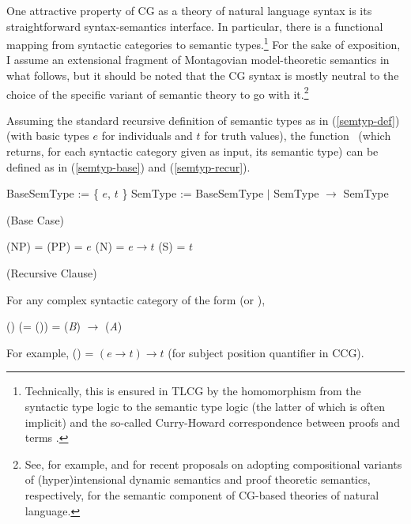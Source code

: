 \documentclass[output=paper
                ,modfonts
                ,nonflat
	        ,collection
	        ,collectionchapter
	        ,collectiontoclongg
 	        ,biblatex
                ,babelshorthands
                ,newtxmath
                ,draftmode
                ,colorlinks, citecolor=brown
]{./langsci/langscibook}
\begin{document}
One attractive property of CG as a theory of natural language syntax
is its straightforward syntax-semantics
interface. In particular, there is a 
functional mapping from syntactic categories to semantic
types.\footnote{Technically, this is ensured in TLCG by the 
homomorphism from the syntactic type logic to the semantic type logic
(the latter of which is often implicit) and the so-called Curry-Howard
correspondence between proofs and terms \citep{vanBenthem88}.}
For the sake of exposition, I assume an extensional fragment of
Montagovian model-theoretic semantics in what follows, but it should be noted that the
CG syntax is mostly neutral to the choice of the specific variant of
semantic theory to go with it.\footnote{See,  for example,  \citet{martin2013} and
\citet{bekkimineshima17} for recent proposals on adopting compositional variants
of (hyper)intensional dynamic semantics and proof theoretic semantics,
respectively, for the semantic component of CG-based theories of
natural language.}

Assuming the standard recursive definition of semantic types
as in (\ref{semtyp-def}) (with basic types $e$ for
individuals and $t$ for truth values), the function \SemTyp\ (which returns, for each
syntactic category given as input, its semantic type) can be defined as in
(\ref{semtyp-base}) and (\ref{semtyp-recur}).

\begin{exe}
 \ex\label{semtyp-def}
  \begin{xlist}
 \ex
    BaseSemType := \{ $e$, $t$ \}
 \ex
    SemType := BaseSemType $|$ SemType \ensuremath{ \rightarrow } SemType
  \end{xlist}
 \ex\label{semtyp-base}
  (Base Case)
  \begin{xlist}
 \ex\label{semtyp-np}
    \SemTyp(NP) = \SemTyp(PP) = $e$
 \ex\label{semtyp-n}
    \SemTyp(N) = $e \ensuremath{ \rightarrow } t$
 \ex\label{semtyp-s}
    \SemTyp(S) = $t$
  \end{xlist}
 \ex\label{semtyp-recur}
  (Recursive Clause)
  
  For any complex syntactic category of the form
      (or ), 
  
     \SemTyp()
     (= \SemTyp()) =
     \SemTyp(\textit{B}) \ensuremath{ \rightarrow } \SemTyp(\textit{A})
\end{exe}
For example, \SemTyp() =  $(e \ensuremath{ \rightarrow } t) \ensuremath{ \rightarrow } t$
(for subject position quantifier in CCG).
\end{document}
